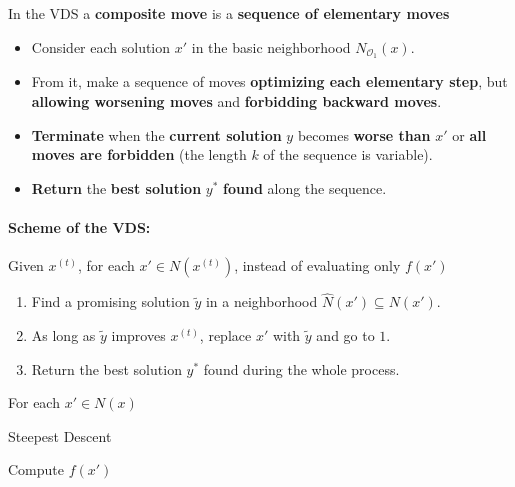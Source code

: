 In the VDS a \textbf{composite move} is a \textbf{sequence of elementary moves}
\begin{itemize}
	\item Consider each solution $x'$ in the basic neighborhood $N_{\mathcal{O}_1} (x)$.\\
	
	\item From it, make a sequence of moves \textbf{optimizing each elementary step}, but \textbf{allowing worsening moves} and \textbf{forbidding backward moves}.\\
	
	\item \textbf{Terminate} when the \textbf{current solution} $y$ becomes \textbf{worse than} $x'$ or \textbf{all moves are forbidden} (the length $k$ of the sequence is variable).\\
	
	\item \textbf{Return} the \textbf{best solution} $y^\ast$ \textbf{found} along the sequence.\\
\end{itemize}

\paragraph{Scheme of the VDS:} Given $x^{(t)}$, for each $x' \in N (x^{(t)})$, instead of evaluating only $f (x')$
\begin{enumerate}
	\item Find a promising solution $\tilde{y}$ in a neighborhood $\hat{N} (x') \subseteq N (x')$.\\
	
	\item As long as $\tilde{y}$ improves $x^{(t)}$, replace $x'$ with $\tilde{y}$ and go to $1$.\\
	
	\item Return the best solution $y^\ast$ found during the whole process.\\
\end{enumerate}

\newpage

\begin{center}
	For each $x' \in N (x)$
\end{center}

\begin{algorithm}
	\caption{Steepest Descent}
	\begin{algorithmic}
		\STATE Compute $f(x')$
	\end{algorithmic}
\end{algorithm}


